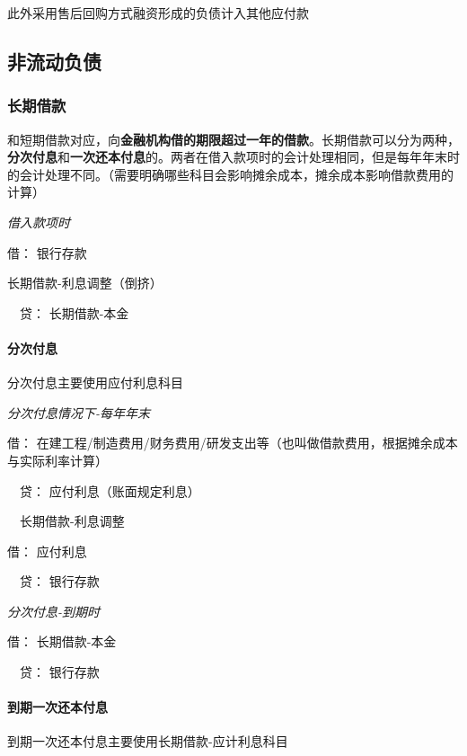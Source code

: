 \documentclass[UTF8,12pt]{ctexart}
\newenvironment{Dr}{\noindent 借：}{\par}
\newenvironment{Cr}{\noindent \ \ 贷：}{\par}
\numberwithin{equation}{section} %
\numberwithin{figure}{section}
\numberwithin{table}{section}
\begin{document}
	此外采用售后回购方式融资形成的负债计入其他应付款
	
	
	\subsection{非流动负债}
	\subsubsection{长期借款}
	和短期借款对应，向\textbf{金融机构借的期限超过一年的借款}。长期借款可以分为两种，\textbf{分次付息}和\textbf{一次还本付息}的。两者在借入款项时的会计处理相同，但是每年年末时的会计处理不同。（需要明确哪些科目会影响摊余成本，摊余成本影响借款费用的计算）
	
	\textit{借入款项时}
	
	\begin{Dr}
		银行存款
		
		长期借款-利息调整（倒挤）
	\end{Dr}	
	\begin{Cr}
		长期借款-本金
	\end{Cr}

	\paragraph{分次付息} 分次付息主要使用应付利息科目

	\textit{分次付息情况下-每年年末}
	
	\begin{Dr}
		在建工程/制造费用/财务费用/研发支出等（也叫做借款费用，根据摊余成本与实际利率计算）
	\end{Dr}
	\begin{Cr}
		应付利息（账面规定利息）
		
		\ \ 长期借款-利息调整
	\end{Cr}
	\begin{Dr}
		应付利息
	\end{Dr}
	\begin{Cr}
		银行存款
	\end{Cr}

	
	\textit{分次付息-到期时}
	
	\begin{Dr}
		长期借款-本金
	\end{Dr}
	\begin{Cr}
		银行存款
	\end{Cr}

	\paragraph{到期一次还本付息} 到期一次还本付息主要使用长期借款-应计利息科目
\end{document}
